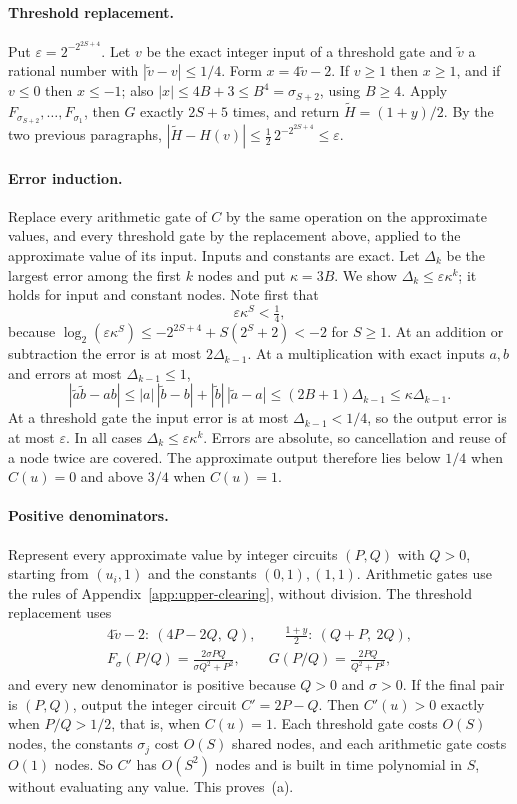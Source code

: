 \paragraph{Threshold replacement.}
Put $\varepsilon=2^{-2^{2S+4}}$. Let $v$ be the exact integer input of a
threshold gate and $\tilde v$ a rational number with $|\tilde v-v|\le1/4$.
Form $x=4\tilde v-2$. If $v\ge1$ then $x\ge1$, and if $v\le0$ then
$x\le-1$; also $|x|\le4B+3\le B^4=\sigma_{S+2}$, using $B\ge4$. Apply
$F_{\sigma_{S+2}},\ldots,F_{\sigma_1}$, then $G$ exactly $2S+5$ times, and
return $\tilde H=(1+y)/2$. By the two previous paragraphs,
$|\tilde H-H(v)|\le\frac12\,2^{-2^{2S+4}}\le\varepsilon$.

\paragraph{Error induction.}
Replace every arithmetic gate of $C$ by the same operation on the
approximate values, and every threshold gate by the replacement above,
applied to the approximate value of its input. Inputs and constants are
exact. Let $\Delta_k$ be the largest error among the first $k$ nodes and put
$\kappa=3B$. We show $\Delta_k\le\varepsilon\kappa^k$; it holds for input and
constant nodes. Note first that
\[
 \varepsilon\kappa^S<\tfrac14,
\]
because $\log_2(\varepsilon\kappa^S)\le-2^{2S+4}+S(2^S+2)<-2$ for $S\ge1$.
At an addition or subtraction the error is at most $2\Delta_{k-1}$. At a
multiplication with exact inputs $a,b$ and errors at most
$\Delta_{k-1}\le1$,
\[
 |\tilde a\tilde b-ab|\le|a|\,|\tilde b-b|+|\tilde b|\,|\tilde a-a|
 \le(2B+1)\Delta_{k-1}\le\kappa\Delta_{k-1}.
\]
At a threshold gate the input error is at most $\Delta_{k-1}<1/4$, so the
output error is at most $\varepsilon$. In all cases
$\Delta_k\le\varepsilon\kappa^k$. Errors are absolute, so cancellation and
reuse of a node twice are covered. The approximate output therefore lies
below $1/4$ when $C(u)=0$ and above $3/4$ when $C(u)=1$.

\paragraph{Positive denominators.}
Represent every approximate value by integer circuits $(P,Q)$ with $Q>0$,
starting from $(u_i,1)$ and the constants $(0,1),(1,1)$. Arithmetic gates use
the rules of Appendix~\ref{app:upper-clearing}, without division. The
threshold replacement uses
\begin{gather*}
 4\tilde v-2:\ (4P-2Q,\ Q),\qquad
 \frac{1+y}2:\ (Q+P,\ 2Q),\\
 F_\sigma(P/Q)=\frac{2\sigma PQ}{\sigma Q^2+P^2},\qquad
 G(P/Q)=\frac{2PQ}{Q^2+P^2},
\end{gather*}
and every new denominator is positive because $Q>0$ and $\sigma>0$. If the
final pair is $(P,Q)$, output the integer circuit $C'=2P-Q$. Then $C'(u)>0$
exactly when $P/Q>1/2$, that is, when $C(u)=1$. Each threshold gate costs
$O(S)$ nodes, the constants $\sigma_j$ cost $O(S)$ shared nodes, and each
arithmetic gate costs $O(1)$ nodes. So $C'$ has $O(S^2)$ nodes and is built in
time polynomial in $S$, without evaluating any value. This proves~(a).

